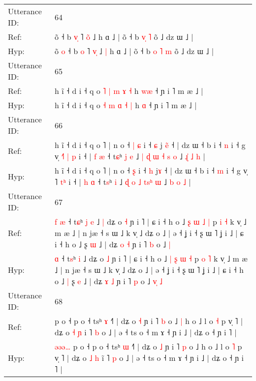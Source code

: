 \documentclass[10pt]{article}
\DeclareRobustCommand{\hl}[1]{{\textcolor{red}{#1}}}
\begin{document}
\begin{longtable}{ll}
 \\
\midrule
Utterance ID: & 64 \\
Ref: & õ\hl{}\hl{} ˧ b \hl{v}\hl{̩} ˥ \hl{o}\hl{̃} ˩\hl{}\hl{} h ɑ ˩ | õ ˧ b \hl{}\hl{v}\hl{̩} \hl{˥} õ ˩ dz ɯ ˩ |
 \\
Hyp: & õ\hl{ }\hl{o} ˧ b \hl{}\hl{o} ˥ \hl{v}\hl{̩} ˩\hl{ }\hl{|} h ɑ ˩ | õ ˧ b \hl{o}\hl{ }\hl{˥} \hl{m} õ ˩ dz ɯ ˩ |
 \\
\midrule
Utterance ID: & 65 \\
Ref: & h ĩ ˧ d i ˧ q o \hl{˥} \hl{|} \hl{m} \hl{ɤ} \hl{˧} h \hl{w}\hl{æ} ˧ ɲ i ˥ m æ ˩ |
 \\
Hyp: & h ĩ ˧ d i ˧ q o \hl{˧} \hl{m} \hl{ɑ} \hl{˧} \hl{|} h \hl{}\hl{ɑ} ˧ ɲ i ˥ m æ ˩ |
 \\
\midrule
Utterance ID: & 66 \\
Ref: & h ĩ ˧ d i ˧ q o ˥ | n o ˧\hl{ }\hl{|} \hl{ɕ} i ˧ \hl{ɕ} j\hl{ }\hl{ẽ} ˧ | dz ɯ ˧ b i ˧ \hl{n} i ˧ g v̩ \hl{˧}˥ \hl{|}\hl{ }\hl{p} i ˧ | \hl{f} \hl{æ} ˧ t\hl{ɕ}ʰ\hl{ }\hl{j} \hl{e} ˩ \hl{|} \hl{ɖ} \hl{ɯ} \hl{˧}\hl{ }\hl{s} \hl{o} ˩ \hl{ɻ}\hl{̍} \hl{˩} \hl{h} |
 \\
Hyp: & h ĩ ˧ d i ˧ q o ˥ | n o ˧\hl{}\hl{} \hl{ʂ} i ˧ \hl{h} j\hl{}\hl{ɤ} ˧ | dz ɯ ˧ b i ˧ \hl{m} i ˧ g v̩ \hl{}˥ \hl{}\hl{t}\hl{ʰ} i ˧ | \hl{h} \hl{ɑ} ˧ t\hl{s}ʰ\hl{}\hl{} \hl{i} ˩ \hl{ɖ} \hl{o} \hl{˩} \hl{t}\hl{s}\hl{ʰ} \hl{ɯ} ˩ \hl{}\hl{b} \hl{o} \hl{˩} |
 \\
\midrule
Utterance ID: & 67 \\
Ref: & \hl{f}\hl{ }\hl{æ} ˧ t\hl{ɕ}ʰ\hl{ }\hl{j} \hl{e} ˩\hl{ }\hl{|} dʑ o \hl{˧} ɲ i ˥ | ɕ i ˧ h o ˩ \hl{ʂ} \hl{ɯ} \hl{˩} \hl{|} p \hl{i} \hl{˧} k v̩ ˩ m æ ˩ | n jæ ˧ s ɯ ˩ k v̩ ˩ dʑ o ˩ | ə ˧ ʝ i ˧ ʂ ɯ ˥ ʝ i ˩ | ɕ i ˧ h o ˩\hl{}\hl{} ʂ \hl{ɯ} ˩ | dʑ \hl{o} \hl{˧} ɲ i ˥ \hl{b} o ˩\hl{}\hl{}\hl{} \hl{|}
 \\
Hyp: & \hl{}\hl{}\hl{ɑ} ˧ t\hl{s}ʰ\hl{}\hl{} \hl{i} ˩\hl{}\hl{} dʑ o \hl{˩} ɲ i ˥ | ɕ i ˧ h o ˩ \hl{|} \hl{ʂ} \hl{ɯ} \hl{˧} p \hl{o} \hl{˥} k v̩ ˩ m æ ˩ | n jæ ˧ s ɯ ˩ k v̩ ˩ dʑ o ˩ | ə ˧ ʝ i ˧ ʂ ɯ ˥ ʝ i ˩ | ɕ i ˧ h o ˩\hl{ }\hl{|} ʂ \hl{e} ˩ | dʑ \hl{ɤ} \hl{˩} ɲ i ˥ \hl{p} o ˩\hl{ }\hl{v}\hl{̩} \hl{˩}
 \\
\midrule
Utterance ID: & 68 \\
Ref: & \hl{}\hl{}\hl{}\hl{}\hl{}p o ˧ p o ˧ tsʰ \hl{ɤ} ˧˥ | dʑ o \hl{˧} ɲ i ˥ \hl{b} o ˩\hl{ }\hl{|} h o ˩ l o \hl{˧} p v̩ ˥ | dʑ o \hl{˧} \hl{ɲ} i\hl{} ˥ \hl{b} o ˩ | ə ˧ ts o ˧ m ɤ ˧ ɲ i ˩ | dʑ o ˧ ɲ i ˥ |
 \\
Hyp: & \hl{ə}\hl{ə}\hl{ə}\hl{…}\hl{ }p o ˧ p o ˧ tsʰ \hl{ɯ} ˧˥ | dʑ o \hl{˩} ɲ i ˥ \hl{p} o ˩\hl{}\hl{} h o ˩ l o \hl{˥} p v̩ ˥ | dʑ o \hl{˩} \hl{h} i\hl{̃} ˥ \hl{p} o ˩ | ə ˧ ts o ˧ m ɤ ˧ ɲ i ˩ | dʑ o ˧ ɲ i ˥ |

\end{longtable}
\end{document}
